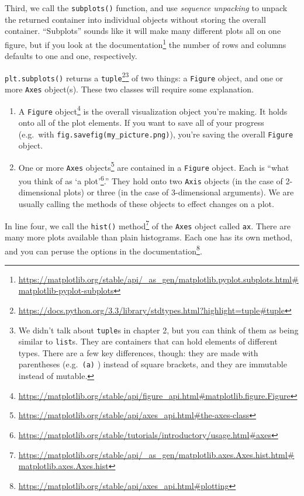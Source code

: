 \documentclass[
  12pt,
  krantz2]{krantz}
\renewcommand{\href}[2]{#2\footnote{\url{#1}}}
\begin{document}
Third, we call the \texttt{subplots()} function, and use \emph{sequence unpacking} to unpack the returned container into individual objects without storing the overall container. ``Subplots'' sounds like it will make many different plots all on one figure, but if you look at the \href{https://matplotlib.org/stable/api/_as_gen/matplotlib.pyplot.subplots.html\#matplotlib-pyplot-subplots}{documentation} the number of rows and columns defaults to one and one, respectively.

\texttt{plt.subplots()} returns a \href{https://docs.python.org/3.3/library/stdtypes.html?highlight=tuple\#tuple}{\texttt{tuple}}\footnote{We didn't talk about \texttt{tuple}s in chapter 2, but you can think of them as being similar to \texttt{list}s. They are containers that can hold elements of different types. There are a few key differences, though: they are made with parentheses (e.g.~\texttt{(\textquotesingle{}a\textquotesingle{})} ) instead of square brackets, and they are immutable instead of mutable.} of two things: a \texttt{Figure} object, and one or more \texttt{Axes} object(s). These two classes will require some explanation.

\begin{enumerate}
\def\labelenumi{\arabic{enumi}.}
\item
  A \href{https://matplotlib.org/stable/api/figure_api.html\#matplotlib.figure.Figure}{\texttt{Figure} object} is the overall visualization object you're making. It holds onto all of the plot elements. If you want to save all of your progress (e.g.~with \texttt{fig.savefig(\textquotesingle{}my\_picture.png\textquotesingle{})}), you're saving the overall \texttt{Figure} object.
\item
  One or more \href{https://matplotlib.org/stable/api/axes_api.html\#the-axes-class}{\texttt{Axes} objects} are contained in a \texttt{Figure} object. Each is ``\href{https://matplotlib.org/stable/tutorials/introductory/usage.html\#axes}{what you think of as `a plot'}.'' They hold onto two \texttt{Axis} objects (in the case of 2-dimensional plots) or three (in the case of 3-dimensional arguments). We are usually calling the methods of these objects to effect changes on a plot.
\end{enumerate}

In line four, we call the \href{https://matplotlib.org/stable/api/_as_gen/matplotlib.axes.Axes.hist.html\#matplotlib.axes.Axes.hist}{\texttt{hist()} method} of the \texttt{Axes} object called \texttt{ax}. There are many more plots available than plain histograms. Each one has its own method, and you can peruse the options in \href{https://matplotlib.org/stable/api/axes_api.html\#plotting}{the documentation}.
\end{document}
